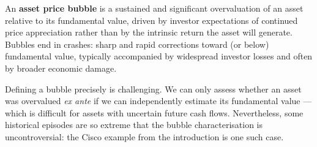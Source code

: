 \documentclass[12pt, letterpaper]{article}
\begin{document}
An \textbf{asset price bubble} is a sustained and significant overvaluation of an asset relative to its fundamental value, driven by investor expectations of continued price appreciation rather than by the intrinsic return the asset will generate. Bubbles end in crashes: sharp and rapid corrections toward (or below) fundamental value, typically accompanied by widespread investor losses and often by broader economic damage.

Defining a bubble precisely is challenging. We can only assess whether an asset was overvalued \textit{ex ante} if we can independently estimate its fundamental value --- which is difficult for assets with uncertain future cash flows. Nevertheless, some historical episodes are so extreme that the bubble characterisation is uncontroversial: the Cisco example from the introduction is one such case.
\end{document}
